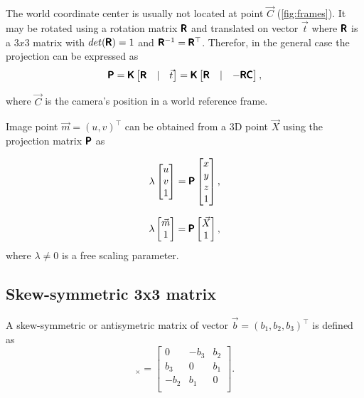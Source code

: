 The world coordinate center is usually not located at point $\vec{C}$ (\autoref{fig:frames}). 
It may be rotated using a rotation matrix $\pmb{\mathsf{R}}$ and translated on vector $\vec{t}$ where $\pmb{\mathsf{R}}$ is a $3x3$ matrix with $det(\pmb{\mathsf{R}}) = 1$ and $\pmb{\mathsf{R}}^{-1} = \pmb{\mathsf{R}}^\top$. 
Therefor, in the general case the projection can be expressed as
\begin{equation}
    \label{eq:PKRt}
    \pmb{\mathsf{P}} = \pmb{\mathsf{K}} \begin{bmatrix} \pmb{\mathsf{R}} & | & \vec{t} \end{bmatrix} = 
    \pmb{\mathsf{K}} \begin{bmatrix} \pmb{\mathsf{R}} & | & - \pmb{\mathsf{R}} \pmb{\mathsf{C}} \end{bmatrix},
\end{equation}

where $\vec{C}$ is the camera's position in a world reference frame. 

Image point $\vec{m} = (u, v)^\top$ can be obtained from a 3D point $\vec{X}$ using the projection matrix $\pmb{\mathsf{P}}$ as

\begin{equation}
    \label{eq:projection}
    \lambda \begin{bmatrix} 
        u \\ v \\ 1 \end{bmatrix} = \pmb{\mathsf{P}} \begin{bmatrix} x \\ y \\ z \\ 1
    \end{bmatrix},
\end{equation}

\begin{equation}
    \label{eq:proj_min}
    \lambda 
    \begin{bmatrix} 
    \vec{m} \\ 1 \end{bmatrix} = \pmb{\mathsf{P}} \begin{bmatrix} \vec{X} \\ 1
    \end{bmatrix},
\end{equation}
where $\lambda \neq 0$ is a free scaling parameter.

\subsection{Skew-symmetric 3x3 matrix}
A skew-symmetric or antisymetric matrix of vector $\vec{b} = (b_1, b_2, b_3)^\top$ is defined as
\begin{equation}
    [\vec{b}]_{\times} = \begin{bmatrix}
        0 & -b_3 & b_2 \\ 
        b_3 & 0 & b_1 \\ 
        -b_2 & b_1 & 0 \\ 
    \end{bmatrix}.
\end{equation}


